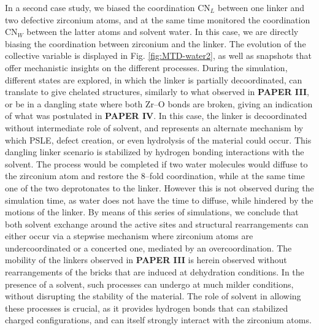 In a second case study, we biased the coordination CN$_L$ between one linker and two defective zirconium atoms, and at the same time monitored the coordination CN$_W$ between the latter atoms and solvent water. In this case, we are directly biasing the coordination between zirconium and the linker. The evolution of the collective variable is displayed in Fig. \ref{fig:MTD-water2}, as well as snapshots that offer mechanistic insights on the different processes. During the simulation, different states are explored, in which the linker is partially decoordinated, can translate to give chelated structures, similarly to what observed in \textbf{PAPER III}, or be in a dangling state where both Zr--O bonds are broken, giving an indication of what was postulated in \textbf{PAPER IV}. In this case, the linker is decoordinated without intermediate role of solvent, and represents an alternate mechanism by which PSLE, defect creation, or even hydrolysis of the material could occur. This dangling linker scenario is stabilized by hydrogen bonding interactions with the solvent. The process would be completed if two water molecules would diffuse to the zirconium atom and restore the 8--fold coordination, while at the same time one of the two deprotonates to the linker. However this is not observed during the simulation time, as water does not have the time to diffuse, while hindered by the motions of the linker.
\npar
By means of this series of simulations, we conclude that both solvent exchange around the active sites and structural rearrangements can either occur via a stepwise mechanism where zirconium atoms are undercoordinated or a concerted one, mediated by an overcoordination. The mobility of the linkers observed in \textbf{PAPER III} is herein observed without rearrangements of the bricks that are induced at dehydration conditions. In the presence of a solvent, such processes can undergo at much milder conditions, without disrupting the stability of the material. The role of solvent in allowing these processes is crucial, as it provides hydrogen bonds that can stabilized charged configurations, and can itself strongly interact with the zirconium atoms.

\clearpage{\pagestyle{empty}\cleardoublepage}